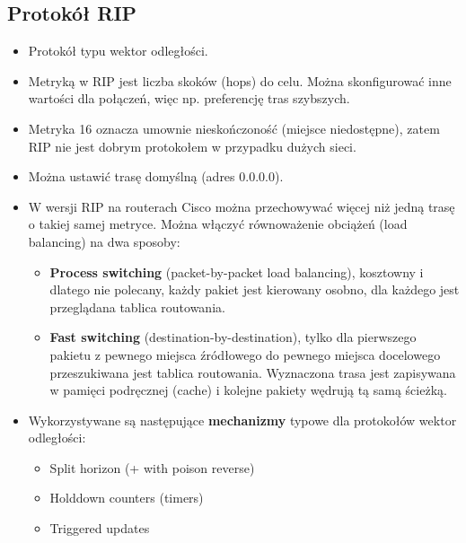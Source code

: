 \documentclass[../main.tex]{subfiles}
\begin{document}
    \subsection{Protokół RIP}
    \begin{itemize}
        \item Protokół typu wektor odległości.

        \item Metryką w RIP jest liczba skoków (hops) do celu. Można skonfigurować inne wartości dla połączeń, więc np. preferencję tras szybszych.

        \item Metryka 16 oznacza umownie nieskończoność (miejsce niedostępne), zatem RIP nie jest dobrym protokołem w przypadku dużych sieci.

        \item Można ustawić trasę domyślną (adres 0.0.0.0).

        \item W wersji RIP na routerach Cisco można przechowywać więcej niż jedną trasę o
        takiej samej metryce. Można włączyć równoważenie obciążeń (load balancing) na dwa
        sposoby:
        \begin{itemize}
            \item \textbf{Process switching} (packet-by-packet load balancing), kosztowny i dlatego nie polecany, każdy pakiet jest kierowany osobno, dla każdego jest przeglądana tablica routowania.
            \item \textbf{Fast switching} (destination-by-destination), tylko dla pierwszego pakietu z pewnego miejsca źródłowego do pewnego miejsca docelowego przeszukiwana jest tablica routowania. Wyznaczona trasa jest zapisywana w pamięci podręcznej (cache) i kolejne pakiety wędrują tą samą ścieżką.
        \end{itemize}

        \item Wykorzystywane są następujące \textbf{mechanizmy} typowe dla protokołów wektor odległości:
        \begin{itemize}
            \item Split horizon (+ with poison reverse)
            \item Holddown counters (timers)
            \item Triggered updates
        \end{itemize}


\end{itemize}
\end{document}
